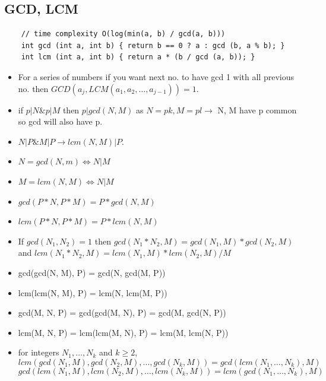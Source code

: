 \documentclass[8pt, a4paper, oneside, twocolumn]{extarticle}
\begin{document}
\subsection{GCD, LCM}
\begin{verbatim}
    // time complexity O(log(min(a, b) / gcd(a, b)))
    int gcd (int a, int b) { return b == 0 ? a : gcd (b, a % b); }
    int lcm (int a, int b) { return a * (b / gcd (a, b)); }
\end{verbatim}
\begin{itemize}
    \item For a series of numbers if you want next no. to have gcd 1 with all previous no. then $GCD(a_j, LCM(a_1, a_2, \dots, a_{j - 1})) = 1$.
    \item if $p|N \& p|M$ then $p|gcd(N, M)$ as $N = pk, M = pl \rightarrow$ N, M have p common so gcd will also have p.
    \item $N|P \& M|P \rightarrow lcm(N, M)|P$.
    \item $N = gcd(N, m) \Leftrightarrow N|M$
    \item $M = lcm(N, M) \Leftrightarrow N|M$
    \item $gcd(P*N, P*M) = P*gcd(N, M)$
    \item $lcm(P*N, P*M) = P*lcm(N, M)$
    \item If $gcd(N_1, N_2) = 1$ then $gcd(N_1 * N_2, M) = gcd(N_1, M) * gcd(N_2, M)$ and $lcm(N_1*N_2, M) = lcm(N_1, M)*lcm(N_2, M)/M$
    \item gcd(gcd(N, M), P) = gcd(N, gcd(M, P))
    \item lcm(lcm(N, M), P) = lcm(N, lcm(M, P))
    \item gcd(M, N, P) = gcd(gcd(M, N), P) = gcd(M, gcd(N, P))
    \item lcm(M, N, P) = lcm(lcm(M, N), P) = lcm(M, lcm(N, P))
    \item for integers $N_1, \dots, N_k$ and $k \geq 2$, 
    $$lcm(gcd(N_1, M), gcd(N_2, M), \dots, gcd(N_k, M)) = gcd(lcm(N_1, \dots, N_k), M)$$
    $$gcd(lcm(N_1, M), lcm(N_2, M), \dots, lcm(N_k, M)) = lcm(gcd(N_1, \dots, N_k), M)$$
\end{itemize}
\end{document}
